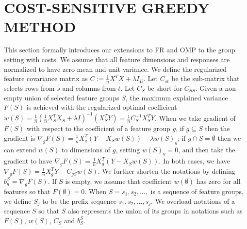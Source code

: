 \section{COST-SENSITIVE GREEDY METHOD}
\label{sec:gomp_method}

This section formally introduces our extensions to FR and OMP to 
the group setting with costs. 
We assume that all feature dimensions and responses are normalized to 
have zero mean and unit variance. 
We define the regularized feature covariance matrix as 
$C := \frac{1}{n}X^TX + \lambda I_D$. Let $C_{st}$ be the sub-matrix that selects rows from $s$ and columns from $t$. Let $C_S$ be short for $C_{SS}$. 
Given a non-empty union of selected feature groups $S$, the maximum explained variance 
$F(S)$ is achieved with the regularized optimal 
coefficient 
\mbox{$w(S) = \frac{1}{n}(\frac{1}{n}X_S^TX_S + \lambda I)^{-1}(X_S^TY) = 
    \frac{1}{n} C_S^{-1}X_S^TY$}.
When we take gradient of $F(S)$ with respect to the coefficient 
of a feature group $g$, if $g \subseteq S$ then the gradient is
\mbox{$\nabla_g F(S) = \frac{1}{n} X_g^T(Y-X_Sw(S)) - \lambda w(S)_g
$}; if 
$g \cap S  =\emptyset$ then we can extend $w(S)$ to dimensions of $g$, setting $w(S)_g = 0$, and then take the gradient to have 
\mbox{$\nabla_g F(S) =\frac{1}{n} X_g^T(Y-X_Sw(S))$}. In both cases,
we have $\nabla_g F(S) = \frac{1}{n} X_g^TY - C_{gS}w(S)$. We further shorten 
the notations by defining $b_g^{S} = \nabla _g F(S)$. 
If $S$ is empty, we assume that coefficient $w(\emptyset)$ has zero for all features so that $F(\emptyset) = 0$. 
When $S = s_1, s_2,...,$ is a sequence of feature groups, we define
$S_j$ to be the prefix sequence $s_1, s_2,..., s_j$. We 
overload notations of a sequence $S$ so that $S$ also represents 
the union of its groups in notations such as $F(S)$, $w(S)$, $C_S$ and $b_S^S$. 






